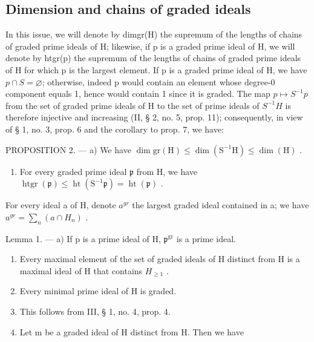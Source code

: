 \subsection{Dimension and chains of graded ideals}

In this issue, we will denote by dimgr(H) the supremum of the lengths of chains of graded prime ideals of H; likewise, if p is a graded prime ideal of H, we will denote by htgr(p) the supremum of the lengths of chains of graded prime ideals of H for which p is the largest element. If p is a graded prime ideal of H, we have \(p \cap S = \varnothing\); otherwise, indeed p would contain an element whose degree-0 component equals 1, hence would contain 1 since it is graded. The map \(p \mapsto S^{-1}p\) from the set of graded prime ideals of H to the set of prime ideals of \(S^{-1}H\) is therefore injective and increasing (II, § 2, no. 5, prop. 11); consequently, in view of § 1, no. 3, prop. 6 and the corollary to prop. 7, we have:

PROPOSITION 2. --- a) We have \(\dim \mathrm{gr}(\mathrm{H}) \leqslant \dim (\mathrm{S}^{-1}\mathrm{H}) \leqslant \dim (\mathrm{H})\) .

\begin{enumerate}
\def\labelenumi{\alph{enumi})}
\setcounter{enumi}{1}
\tightlist
\item
  For every graded prime ideal \(\mathfrak{p}\) from H, we have \(\operatorname{htgr}(\mathfrak{p}) \leqslant \operatorname{ht}(\mathrm{S}^{-1}\mathfrak{p}) = \operatorname{ht}(\mathfrak{p})\) .
\end{enumerate}

For every ideal a of H, denote \(a^{gr}\) the largest graded ideal contained in a; we have \(a^{gr} = \sum_{n} (a \cap H_n)\) .

Lemma 1. --- a) If p is a prime ideal of H, \(\mathfrak{p}^{\mathrm{gr}}\) is a prime ideal.

\begin{enumerate}
\def\labelenumi{\alph{enumi})}
\setcounter{enumi}{1}
\item
  Every maximal element of the set of graded ideals of H distinct from H is a maximal ideal of H that contains \(H_{\geq1}\) .
\item
  Every minimal prime ideal of H is graded.
\item
  This follows from III, § 1, no. 4, prop. 4.
\item
  Let m be a graded ideal of H distinct from H. Then we have
\end{enumerate}

